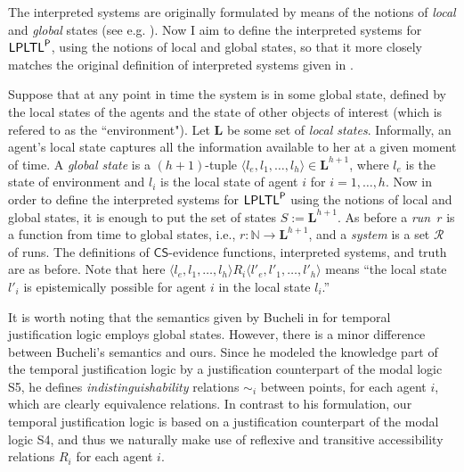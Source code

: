 \documentclass[envcountsect,envcountsame,oribibl,orivec]{llncs}
\newcommand{\LPLTLp}{\textsf{LPLTL}^{\sf P}}
\newcommand{\CS}{\textsf{CS}}
\newcommand{\numberofagents}{h}
\newcommand{\agent}{i}
\newcommand{\localstates}{\mathbf{L}}
\newcommand{\runs}{\mathcal{R}}
\newcommand{\accrel}{\sim}
\newcommand{\N}{\mathbb{N}}
\begin{document}
\begin{remark}
	The interpreted systems are originally formulated by means of the notions of \textit{local} and \textit{global} states (see e.g. \cite{FHMV95,HvdMV04}). Now I aim to define the interpreted systems for $\LPLTLp$, using the notions of local and global states, so that it more closely matches the original definition of interpreted systems given in \cite{FHMV95}.
	
	Suppose that at any point in time the system is in some global state, defined by the local states of the agents and the state of other objects of interest (which is refered to as the ``environment"). Let $\localstates$ be some set of \emph{local states}. Informally, an agent's local state captures all the information available to her at a given moment of time. A \emph{global state} is a $(\numberofagents+1)$-tuple $\langle l_e, l_1, \dots, l_\numberofagents \rangle \in \localstates^{\numberofagents+1}$, where $l_e$ is the state of environment and $l_i$ is the local state of agent $i$ for $i = 1, \ldots,h$. Now in order to  define the interpreted systems for $\LPLTLp$ using the notions of local and global states, 	it is enough to put the set of states $S := \localstates^{\numberofagents+1}$. 
	As before a \emph{run}~$r$ is a function from time to global states, i.e.,  $r: \N \to \localstates^{\numberofagents+1}$, and a \emph{system} is a set $\runs$ of runs. The  definitions of $\CS$-evidence functions, interpreted systems, and truth are as before. Note that here $\langle l_e, l_1, \dots, l_\numberofagents \rangle R_i \langle l'_e, l'_1, \dots, l'_\numberofagents \rangle$ means ``the local state $l'_i$ is epistemically possible for agent $i$ in the local state $l_i$.''
	
	It is  worth noting that the semantics given by Bucheli in \cite{Bucheli15} for temporal justification logic employs global states. However, there is a minor difference between Bucheli's semantics and ours. Since he modeled the knowledge part of the temporal justification logic by a justification counterpart of the modal logic {\sf S5}, he defines \textit{indistinguishability} relations $\accrel_\agent$ between points, for each agent $i$, which are clearly equivalence relations. In contrast to his formulation, our temporal justification logic is based on a justification counterpart of the modal logic {\sf S4}, and thus we naturally make use of reflexive and transitive accessibility relations $R_\agent$ for each agent $i$.
\end{remark}
\end{document}
